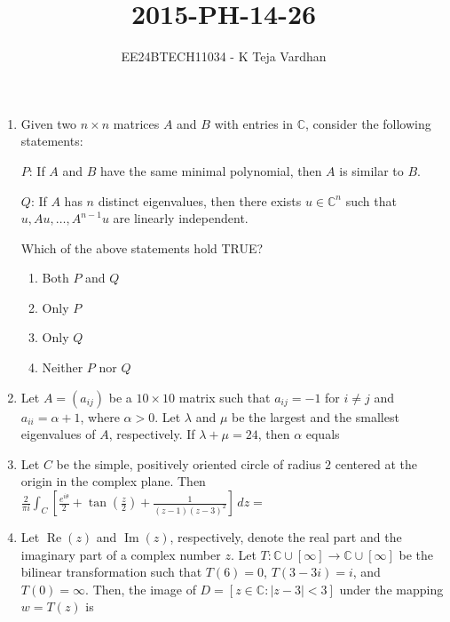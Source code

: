 \documentclass{article}
\newcommand{\brak}[1]{\left( #1 \right)}
\newcommand{\sbrak}[1]{\left[ #1 \right]}
\newcommand{\abs}[1]{\left| #1 \right|}
\newcommand{\lt}{<}
\newcommand{\gt}{>}
\begin{document}

\title{2015-PH-14-26}
\author{EE24BTECH11034 - K Teja Vardhan}
{\let\newpage\relax\maketitle}

\begin{enumerate}

\item Given two $n \times n$ matrices $A$ and $B$ with entries in $\mathbb{C}$, consider the following statements:

$P$: If $A$ and $B$ have the same minimal polynomial, then $A$ is similar to $B$.

$Q$: If $A$ has $n$ distinct eigenvalues, then there exists $u \in \mathbb{C}^n$ such that  
 $u, A u, \ldots, A^{n-1} u$ are linearly independent.

Which of the above statements hold TRUE?

\begin{enumerate}
    \item Both $P$ and $Q$
    \item Only $P$
    \item Only $Q$
    \item Neither $P$ nor $Q$
\end{enumerate}

\item Let $A = \brak{a_{ij}}$ be a $10 \times 10$ matrix such that $a_{ij} = -1$ for $i \neq j$ and $a_{ii} = \alpha + 1$, where $\alpha \gt 0$. Let $\lambda$ and $\mu$ be the largest and  
 the smallest eigenvalues of $A$, respectively. If $\lambda + \mu = 24$, then $\alpha$ equals  

\item Let $C$ be the simple, positively oriented circle of radius $2$ centered at the origin in the complex plane. Then
$\frac{2}{\pi i}\int_{C} \sbrak{\frac{e^{i \theta}}{2} + \tan \brak{\frac{z}{2}} + \frac{1}{\brak{z - 1} \brak{z - 3}^2}} \, dz = $

\item Let $\operatorname{Re} \brak{z}$ and $\operatorname{Im} \brak{z}$, respectively, denote the real part and the imaginary part of a complex number $z$. Let $T: \mathbb{C} \cup \sbrak{\infty}  
 \to \mathbb{C} \cup \sbrak{\infty}$ be the bilinear transformation such that $T \brak{6} = 0$, $T \brak{3 - 3 i} = i$, and $T \brak{0} = \infty$. Then, the image of $D = \sbrak{z \in \mathbb{C} : \abs{z - 3} \lt 3}$ under the mapping $w = T \brak{z}$ is


\end{enumerate}
\end{document}
